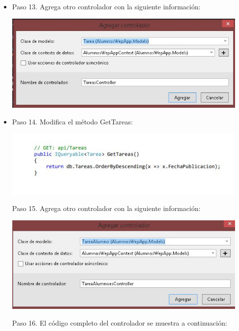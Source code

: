 \begin{flushleft}
\begin{itemize}
\item Paso 13. Agrega otro controlador con la siguiente información: 
\begin{center}
	\includegraphics[width=12cm]{./Imagenes/paso13} 
	\end{center}

\item Paso 14. Modifica el método GetTareas: 

\begin{center}
	\includegraphics[width=12cm]{./Imagenes/paso14} 
	\end{center}

Paso 15. Agrega otro controlador con la siguiente información: 
\begin{center}
	\includegraphics[width=12cm]{./Imagenes/paso15} 
	\end{center}

Paso 16. El código completo del controlador se muestra a continuación: 


\end{itemize}
\end{flushleft}
